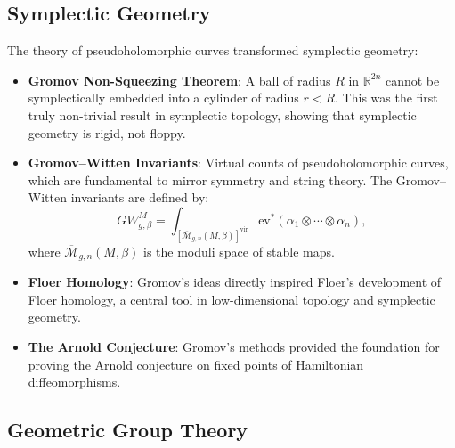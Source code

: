 \subsection{Symplectic Geometry}

The theory of pseudoholomorphic curves transformed symplectic geometry:
\begin{itemize}
\item \textbf{Gromov Non-Squeezing Theorem}: A ball of radius $R$ in $\mathbb{R}^{2n}$ cannot be symplectically embedded into a cylinder of radius $r < R$. This was the first truly non-trivial result in symplectic topology, showing that symplectic geometry is rigid, not floppy.
\item \textbf{Gromov--Witten Invariants}: Virtual counts of pseudoholomorphic curves, which are fundamental to mirror symmetry and string theory. The Gromov--Witten invariants are defined by:
\[
GW_{g,\beta}^M = \int_{[\overline{\mathcal{M}}_{g,n}(M,\beta)]^{\text{vir}}} \mathrm{ev}^*(\alpha_1 \otimes \cdots \otimes \alpha_n),
\]
where $\overline{\mathcal{M}}_{g,n}(M,\beta)$ is the moduli space of stable maps.
\item \textbf{Floer Homology}: Gromov's ideas directly inspired Floer's development of Floer homology, a central tool in low-dimensional topology and symplectic geometry.
\item \textbf{The Arnold Conjecture}: Gromov's methods provided the foundation for proving the Arnold conjecture on fixed points of Hamiltonian diffeomorphisms.
\end{itemize}

\subsection{Geometric Group Theory}

